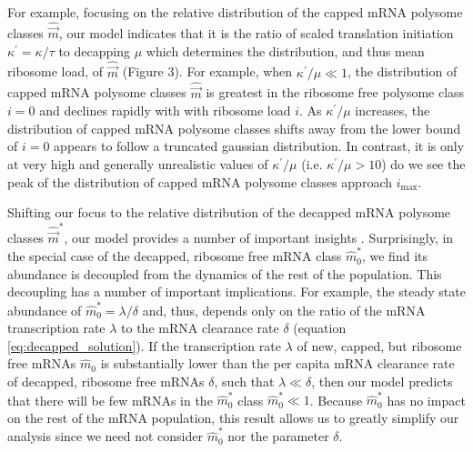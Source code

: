 \documentclass[review]{elsarticle}
\newcommand\mmpar[1]{\marginpar{\begin{spacing}{0.7}\raggedright \singlespacing \tiny \textbf{M:} #1 \end{spacing}}}  %
\newcommand{\imax}{\ensuremath{{i_{\max}}}\xspace}
\newcommand{\kappaprime}{\ensuremath{\kappa^{\prime}}\xspace}
\newcommand{\mhat}{\ensuremath{\hat{m}}\xspace}
\newcommand{\mvec}{\ensuremath{\vec{m}}\xspace}
\newcommand{\mvechat}{\ensuremath{\hat{\mvec}}\xspace}
\newcommand{\mvechatstar}{\ensuremath{\mvechat^*}\xspace}
\begin{document}
For example, focusing on the relative distribution of the capped mRNA polysome classes $\mvechat$, our model indicates that it is the ratio of scaled translation initiation $\kappaprime = \kappa/\tau$ to decapping $\mu$ which determines the distribution, and thus mean ribosome load, of $\mvechat$  (Figure 3).
    For example, when $\kappaprime/\mu \ll 1$, the distribution of capped mRNA polysome classes $\mvechat$ is greatest in the ribosome free polysome class $i=0$ and declines rapidly with with ribosome load $i$.
    As $\kappaprime/\mu$ increases, the distribution of capped mRNA polysome classes shifts away from the lower bound of $i = 0$ appears to follow a truncated gaussian distribution.
    In contrast, it is only at very high and generally unrealistic values of $\kappaprime/\mu$ (i.e. $\kappaprime/\mu > 10$) do we see the peak of the distribution of capped mRNA polysome classes approach $\imax$.



Shifting our focus to the relative distribution of the decapped mRNA polysome classes \mvechatstar, our model provides a number of important insights .
Surprisingly, in the special case of the decapped, ribosome free mRNA class $\mhat_0^*$, we find its abundance is decoupled from the dynamics of the rest of the population.
  This decoupling has a number of important implications.
  For example, the steady state abundance of $\mhat_0^* = \lambda/\delta$ and, thus, depends only on the ratio of the mRNA transcription rate $\lambda$ to the mRNA clearance rate $\delta$ (equation \ref{eq:decapped_solution}).
  If the transcription rate $\lambda$ of new, capped, but ribosome free mRNAs $\mhat_0$ is substantially lower than the per capita mRNA clearance rate of decapped, ribosome free mRNAs $\delta$, such that  $\lambda \ll \delta$, then our model predicts that there will be few mRNAs in the $\mhat_0^*$ class $\mhat_0^* \ll 1$.
  Because $\mhat^*_0$ has no impact on the rest of the mRNA population, this result allows us to greatly simplify our analysis since we need not consider $\mhat_0^*$ nor the parameter $\delta$.
\end{document}
